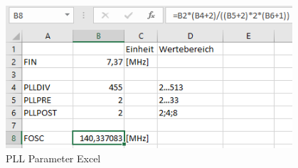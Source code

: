 \begin{figure}
	\centering
	\includegraphics[width=0.95\textwidth]{Images/PLLParameterExcel}
	\caption[Berechnung der PLL Parameter in Excel]{PLL Parameter Excel}
	\label{image:PLLParameterExcel}
\end{figure}